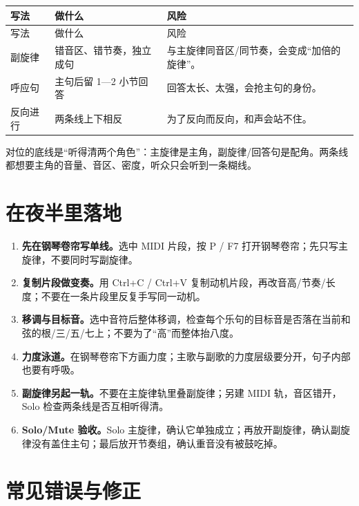 \begin{longtable}{p{}p{}p{}}
\toprule
写法 & 做什么 & 风险 \\
\midrule
\endfirsthead
\toprule
写法 & 做什么 & 风险 \\
\midrule
\endhead
副旋律 & 错音区、错节奏，独立成句 & 与主旋律同音区/同节奏，会变成“加倍的旋律”。 \\
呼应句 & 主句后留 1—2 小节回答 & 回答太长、太强，会抢主句的身份。 \\
反向进行 & 两条线上下相反 & 为了反向而反向，和声会站不住。 \\
\bottomrule
\end{longtable}

对位的底线是“听得清两个角色”：主旋律是主角，副旋律/回答句是配角。两条线都想要主角的音量、音区、密度，听众只会听到一条糊线。

\section{在夜半里落地}
\label{sec:melody-yeban}

\begin{enumerate}
\item \textbf{先在钢琴卷帘写单线。}选中 MIDI 片段，按 P / F7 打开钢琴卷帘；先只写主旋律，不要同时写副旋律。
\item \textbf{复制片段做变奏。}用 Ctrl+C / Ctrl+V 复制动机片段，再改音高/节奏/长度；不要在一条片段里反复手写同一动机。
\item \textbf{移调与目标音。}选中音符后整体移调，检查每个乐句的目标音是否落在当前和弦的根/三/五/七上；不要为了“高”而整体抬八度。
\item \textbf{力度泳道。}在钢琴卷帘下方画力度；主歌与副歌的力度层级要分开，句子内部也要有呼吸。
\item \textbf{副旋律另起一轨。}不要在主旋律轨里叠副旋律；另建 MIDI 轨，音区错开，Solo 检查两条线是否互相听得清。
\item \textbf{Solo/Mute 验收。}Solo 主旋律，确认它单独成立；再放开副旋律，确认副旋律没有盖住主句；最后放开节奏组，确认重音没有被鼓吃掉。
\end{enumerate}


\section{常见错误与修正}
\label{sec:melody-mistakes}

